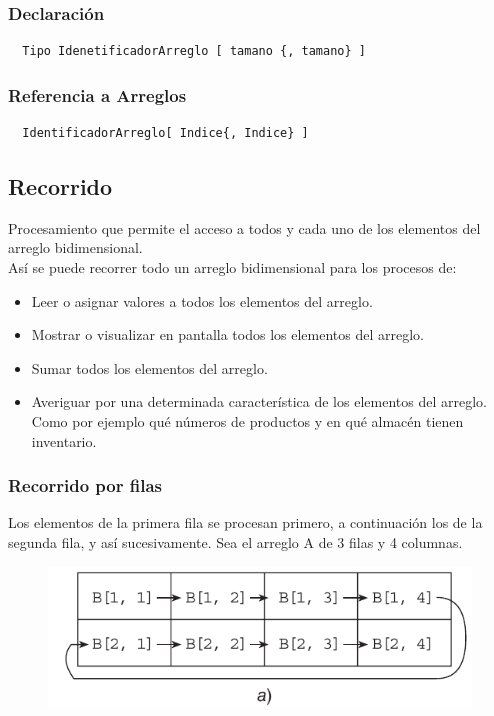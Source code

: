 \documentclass{article}
\begin{document}
\subsubsection*{Declaración}%

\begin{verbatim}
  Tipo IdenetificadorArreglo [ tamano {, tamano} ]
\end{verbatim}

\subsubsection*{Referencia a Arreglos}%

\begin{verbatim}
  IdentificadorArreglo[ Indice{, Indice} ]
\end{verbatim}

\subsection*{Recorrido}%
Procesamiento que permite el acceso a todos y cada uno de los elementos del
arreglo bidimensional.\\
Así se puede recorrer todo un arreglo bidimensional para los procesos de:
\begin{itemize}
  \item Leer o asignar valores a todos los elementos del arreglo.
  \item Mostrar o visualizar en pantalla todos los elementos del arreglo.
  \item Sumar todos los elementos del arreglo.
  \item Averiguar por una determinada característica de los elementos del
    arreglo. Como por ejemplo qué números de productos y en qué almacén tienen
    inventario.
\end{itemize}

\subsubsection*{Recorrido por filas}%
Los elementos de la primera fila se procesan primero, a continuación los de la
segunda fila, y así sucesivamente. Sea el arreglo A de 3 filas y 4 columnas.\\

\begin{figure}[h!]
  \centering
  \includegraphics[scale=0.75]{./pictures/recorrido_filas.png}
\end{figure}
\end{document}
